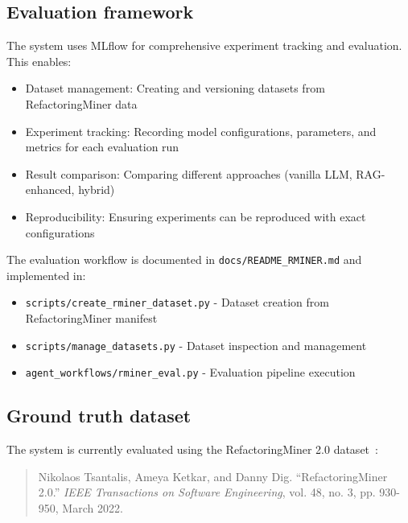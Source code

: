 \subsection{Evaluation framework}

The system uses MLflow for comprehensive experiment tracking and evaluation. This enables:

\begin{itemize}
    \item Dataset management: Creating and versioning datasets from RefactoringMiner data
    \item Experiment tracking: Recording model configurations, parameters, and metrics for each evaluation run
    \item Result comparison: Comparing different approaches (vanilla LLM, RAG-enhanced, hybrid)
    \item Reproducibility: Ensuring experiments can be reproduced with exact configurations
\end{itemize}

The evaluation workflow is documented in \texttt{docs/README\_RMINER.md} and implemented in:
\begin{itemize}
    \item \texttt{scripts/create\_rminer\_dataset.py} - Dataset creation from RefactoringMiner manifest
    \item \texttt{scripts/manage\_datasets.py} - Dataset inspection and management
    \item \texttt{agent\_workflows/rminer\_eval.py} - Evaluation pipeline execution
\end{itemize}

\subsection{Ground truth dataset}

The system is currently evaluated using the RefactoringMiner 2.0 dataset~\cite{tsantalis2022refactoringminer}:

\begin{quote}
Nikolaos Tsantalis, Ameya Ketkar, and Danny Dig. ``RefactoringMiner 2.0.'' \textit{IEEE Transactions on Software Engineering}, vol. 48, no. 3, pp. 930-950, March 2022.
\end{quote}

